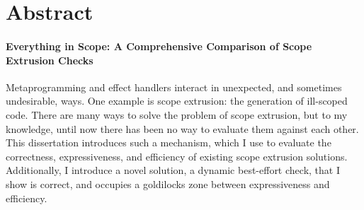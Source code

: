 \chapter*{Abstract}

\subsubsection*{Everything in Scope: A Comprehensive Comparison of Scope Extrusion Checks}
Metaprogramming and effect handlers interact in unexpected, and sometimes undesirable, ways. One example is scope extrusion: the generation of ill-scoped code. There are many ways to solve the problem of scope extrusion, but to my knowledge, until now there has been no way to evaluate them against each other. This dissertation introduces such a mechanism, which I use to evaluate the correctness, expressiveness, and efficiency of existing scope extrusion solutions. Additionally, I introduce a novel solution, a dynamic best-effort check, that I show is correct, and occupies a goldilocks zone between expressiveness and efficiency. 